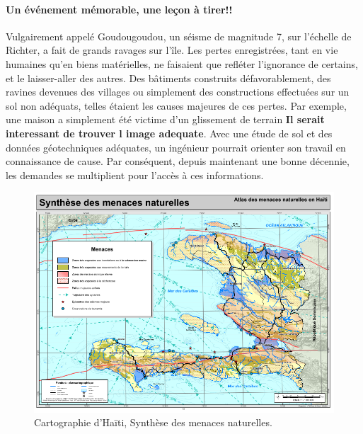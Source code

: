 \paragraph{Un événement mémorable, une leçon à tirer!!}
Vulgairement appelé Goudougoudou, un séisme de magnitude 7, sur l'échelle de Richter, 
a fait de grands ravages sur l'île. Les pertes enregistrées, tant en vie humaines qu'en biens
matérielles, ne faisaient que refléter l'ignorance de certains, et le laisser-aller des autres. 
Des bâtiments construits défavorablement, des ravines devenues des villages ou simplement des 
constructions effectuées sur un sol non adéquats, telles étaient les causes majeures de ces 
pertes. Par exemple, une maison a simplement été victime d'un glissement de terrain \textbf{Il 
serait interessant de trouver l image adequate}. Avec une 
étude de sol et des données géotechniques adéquates, un ingénieur pourrait orienter son travail
en connaissance de cause. Par conséquent, depuis maintenant une bonne décennie, les demandes
se multiplient pour l'accès à ces informations.  

\begin{figure}
    \centering
    \includegraphics[width=1\textwidth]{images/Contexte/haiti.png}
    \caption{Cartographie d'Haïti, Synthèse des menaces naturelles.}
    \label{fig:haiti}
\end{figure}

